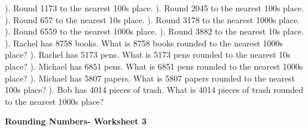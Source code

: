 \documentclass{article}%
\begin{document}
\newline%
\newline%
). Round 1173 to the nearest 100s place.%
\newline%
\newline%
). Round 2045 to the nearest 100s place.%
\newline%
\newline%
). Round 657 to the nearest 10s place.%
\newline%
\newline%
). Round 3178 to the nearest 1000s place.%
\newline%
\newline%
). Round 6559 to the nearest 1000s place.%
\newline%
\newline%
). Round 3882 to the nearest 10s place.%
\newline%
\newline%
). Rachel has 8758 books. What is 8758 books rounded to the nearest 1000s place?%
\newline%
\newline%
). Rachel has 5173 pens. What is 5173 pens rounded to the nearest 10s place?%
\newline%
\newline%
). Michael has 6851 pens. What is 6851 pens rounded to the nearest 1000s place?%
\newline%
\newline%
). Michael has 5807 papers. What is 5807 papers rounded to the nearest 100s place?%
\newline%
\newline%
). Bob has 4014 pieces of trash. What is 4014 pieces of trash rounded to the nearest 1000s place?%
\newline%
\newline%
\newline%
\pagebreak%
\large%
\begin{center}%
\textbf{Rounding Numbers- Worksheet 3}%
\newline%
\newline%
\newline%
\end{center} \normalsize%
\end{document}

